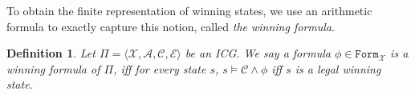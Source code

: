 \documentclass[review]{elsarticle}
\newcommand{\formula}{\mathtt{Form}}
\newcommand{\set}[1]{\{ #1 \}}
\newcommand{\tuple}[1]{\langle {#1} \rangle}
\newcommand{\statevar}{\mathcal{X}}
\newcommand{\winSet}{\mathcal{W}}
\newcommand{\act}{\mathcal{A}}
\newcommand{\constraint}{\mathcal{C}}
\newcommand{\estate}{\mathcal{E}}
\newcommand{\pre}{\mathtt{pre}}
\newcommand{\eff}{\mathtt{eff}}
\newcommand{\suc}{\tau}
\newcommand{\modulo}{\equiv}
\newcommand{\jumpZero}[1][]{\mathtt{JZ}(#1)}
\newtheorem{definition}{Definition}
\begin{document}
%			
%			
%		
	
	
    To obtain the finite representation of winning states, we use an arithmetic formula to exactly capture this notion, called \textit{the winning formula}.
	\begin{definition} \label{def:winForm} \rm
		Let $\Pi = \tuple{\statevar, \act, \constraint, \estate}$ be an ICG. %
		We say a formula $\phi \in \formula_{\statevar}$ is a \textit{winning formula} of $\Pi$, iff for every state $s$, $s \models \constraint \land \phi$ iff $s$ is a legal winning state.
	\end{definition}
\end{document}
